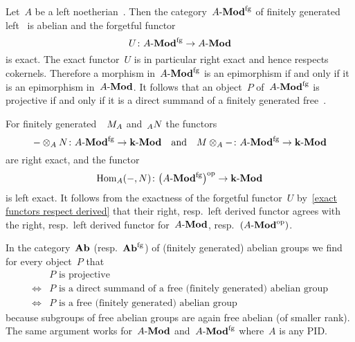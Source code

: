 \begin{remark}
  Let~$A$ be a left noetherian~{\kalg}.
  Then the category~$\text{$A$-$\mathbf{Mod}^{\mathrm{fg}}$}$ of finitely generated left~{} is abelian and the forgetful functor
  \[
    U
    \colon
    \text{$A$-$\mathbf{Mod}^{\mathrm{fg}}$}
    \to
    \text{$A$-$\mathbf{Mod}$}
  \]
  is exact.
  The exact functor~$U$ is in particular right exact and hence respects cokernels.
  Therefore a morphism in~$\text{$A$-$\mathbf{Mod}^{\mathrm{fg}}$}$ is an epimorphism if and only if it is an epimorphism in~$\text{$A$-$\mathbf{Mod}$}$.
  It follows that an object~$P$ of~$\text{$A$-$\mathbf{Mod}^{\mathrm{fg}}$}$ is projective if and only if it is a direct summand of a finitely 
  generated free~{}.
  
  For finitely generated~{}~$\indmodule{M}[A]$ and~$\indmodule[A]{N}$ the functors
  \[
    - \otimes_A N
    \colon
    \text{$A$-$\mathbf{Mod}^{\mathrm{fg}}$}
    \to
    \text{$\mathbf{k}$-$\mathbf{Mod}$}
    \quad\text{and}\quad
    M \otimes_A -
    \colon
    \text{$A$-$\mathbf{Mod}^{\mathrm{fg}}$}
    \to
    \text{$\mathbf{k}$-$\mathbf{Mod}$}
  \]
  are right exact, and the functor
  \[
    \operatorname{Hom}_A(-,N)
    \colon
    \bigl( \text{$A$-$\mathbf{Mod}^{\mathrm{fg}}$} \bigr)^{\mathrm{op}}
    \to
    \text{$\mathbf{k}$-$\mathbf{Mod}$}
  \]
  is left exact.
  It follows from the exactness of the forgetful functor~$U$ by~\cref{exact functors respect derived} that their right, resp.\ left derived functor agrees with the right, resp.\ left derived functor for~$\text{$A$-$\mathbf{Mod}$}$, resp.~$(\text{$A$-$\mathbf{Mod}$}^{\mathrm{op}})$.
\end{remark}










\begin{example}
  In the category~$\mathbf{Ab}$ (resp.~$\mathbf{Ab}^{\mathrm{fg}}$) of (finitely generated) abelian groups we find for every object~$P$ that
  \begin{align*}
    {}&
    \text{$P$ is projective}
    \\
    \iff{}&
    \text{$P$ is a direct summand of a free (finitely generated) abelian group}
    \\
    \iff{}&
    \text{$P$ is a free (finitely generated) abelian group}
  \end{align*}
  because subgroups of free abelian groups are again free abelian (of smaller rank).
  The same argument works for~$\text{$A$-$\mathbf{Mod}$}$ and~$\text{$A$-$\mathbf{Mod}^{\mathrm{fg}}$}$ where~$A$ is any PID.
\end{example}




